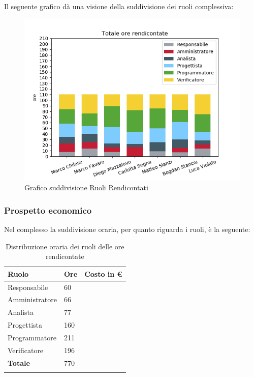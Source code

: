 Il seguente grafico dà una visione della suddivisione dei ruoli complessiva:

\begin{figure}[H]
	\centering
  		\includegraphics[width=1\linewidth]{./images/fig_tor.png}
  		\caption{Grafico suddivisione Ruoli Rendicontati}
  		\label{fig:grafico suddivione ruoli}
\end{figure}


\subsubsection{Prospetto economico}
Nel complesso la suddivisione oraria, per quanto riguarda i ruoli, è la seguente: 


\begin{longtable}{| C{.30\textwidth}| C{.15\textwidth}| C{.20\textwidth}|}
\hline
\textbf{Ruolo} & \textbf{Ore} & \textbf{Costo in \euro} \\
\hline
Responsabile & 60 &  \\
\hline
Amministratore & 66 &  \\
\hline
Analista & 77 &  \\
\hline
Progettista & 160 & \\
\hline 
Programmatore & 211 &  \\
\hline
Verificatore & 196 &  \\
\hline 
\textbf{Totale} & 770 & \\
\hline

\caption{Distribuzione oraria dei ruoli delle ore rendicontate}
\label{Distribuzione oraria a carico del committente}
\end{longtable}

